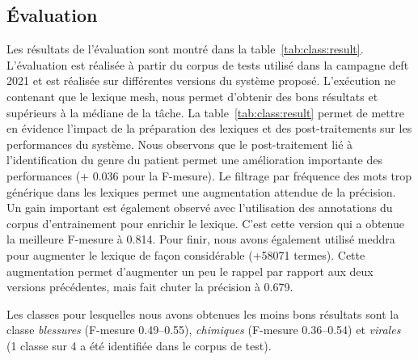 \subsection{Évaluation}

Les résultats de l'évaluation sont montré dans la table~\ref{tab:class:result}.
L'évaluation est réalisée à partir du corpus de tests utilisé dans la campagne \gls{deft} 2021 et est réalisée sur différentes versions du système proposé.
L'exécution ne contenant que le lexique \gls{mesh}, nous permet d'obtenir des bons résultats et supérieurs à la médiane de la tâche.
La table~\ref{tab:class:result} permet de mettre en évidence l'impact de la préparation des lexiques et des post-traitements sur les performances du système.
Nous observons que le post-traitement lié à l'identification du genre du patient permet une amélioration importante des performances (+ \num{0,036} pour la F-mesure).
Le filtrage par fréquence des mots trop générique dans les lexiques permet une augmentation attendue de la précision.
Un gain important est également observé avec l'utilisation des annotations du corpus d'entrainement pour enrichir le lexique.
C'est cette version qui a obtenue la meilleure F-mesure à \num{0,814}.
Pour finir, nous avons également utilisé \gls{meddra} pour augmenter le lexique de façon considérable (+\num{58071} termes).
Cette augmentation permet d'augmenter un peu le rappel par rapport aux deux versions précédentes, mais fait chuter la précision à \num{0,679}.

Les classes pour lesquelles nous avons obtenues les moins bons résultats sont la classe \emph{blessures} (F-mesure \numrange{0,49}{0,55}), \emph{chimiques} (F-mesure \numrange{0,36}{0,54}) et \emph{virales} (1 classe sur 4 a été identifiée dans le corpus de test).

